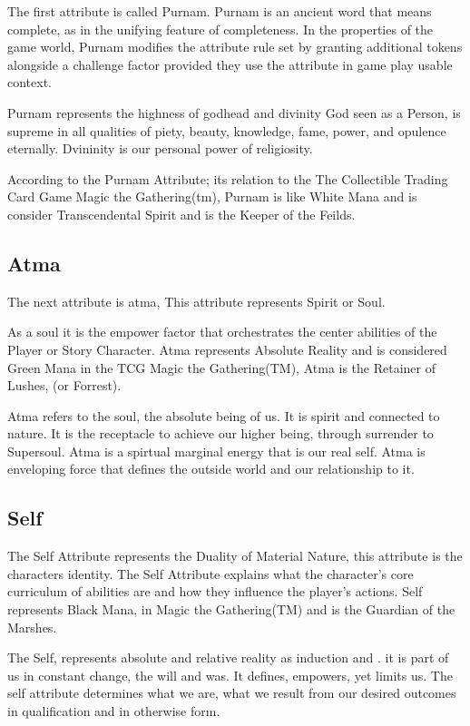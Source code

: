 \documentclass{article}
\begin{document}
The first attribute is called Purnam. Purnam is an ancient word that means complete, as in the unifying feature of completeness. In the properties of the game world, Purnam modifies the attribute rule set by granting additional tokens alongside a challenge factor provided they use the attribute in game play usable context.

Purnam represents the highness of godhead and divinity God seen as a Person, is supreme in all qualities of piety, beauty, knowledge, fame, power, and opulence eternally. Dvininity is our personal power of religiosity.

According to the Purnam Attribute; its relation to the The Collectible Trading Card Game Magic the Gathering(tm), Purnam is like White Mana and is consider Transcendental Spirit and is the Keeper of the Feilds.

\subsection{Atma}

The next attribute is atma, This attribute represents Spirit or Soul.

As a soul it is the empower factor that orchestrates the center abilities of the Player or Story Character. Atma represents Absolute Reality and is considered Green Mana in the TCG Magic the Gathering(TM),  Atma is the Retainer of Lushes, (or Forrest).

Atma refers to the soul, the absolute being of us. It is spirit and connected to nature. It is the receptacle to achieve our higher being, through surrender to Supersoul. Atma is a spirtual marginal energy that is our real self. Atma is enveloping force that defines the outside world and our relationship to it.


\subsection{Self}

The Self Attribute represents the Duality of Material Nature, this attribute is the characters identity. The Self Attribute explains what the character's core curriculum of abilities are and how they influence the player's actions. Self represents Black Mana, in Magic the Gathering(TM) and is the Guardian of the Marshes.

The Self, represents absolute and relative reality as induction and . it is part of us in constant change, the will and was. It defines, empowers, yet limits us. The self attribute determines what we are, what we result from our desired outcomes in qualification and in otherwise form.
\end{document}
